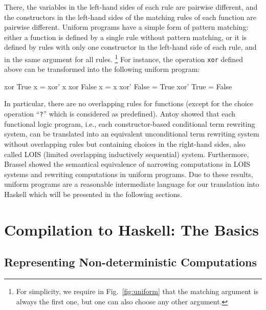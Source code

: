 \documentclass{llncs}
\newcommand{\code}[1]{\mbox{\small\texttt{#1}}}
\newcommand{\ccode}[1]{``\code{#1}''}
\begin{document}
There, the variables in the left-hand sides of each rule are pairwise
different, and
the constructors in the left-hand sides of the matching rules of each function
are pairwise different.
Uniform programs have a simple form of pattern matching:
either a function is defined by a single rule without pattern matching,
or it is defined by rules with only one constructor in the left-hand
side of each rule, and in the same argument for all rules.%
\footnote{For simplicity, we require in
Fig.~\ref{fig:uniform} that the matching argument is always the
first one, but one can also choose any other argument.}
For instance, the operation \code{xor} defined above can be transformed
into the following uniform program:
%
\begin{curry}
  xor True   x = xor' x
  xor False  x = x
  xor' False = True
  xor' True  = False
\end{curry}
%
In particular, there are no overlapping rules for functions
(except for the choice operation \ccode{?} which is considered as predefined).
Antoy \cite{Antoy01PPDP} showed that each functional logic program,
i.e., each constructor-based conditional term rewriting system,
can be translated into an equivalent unconditional term rewriting system
without overlapping rules but containing choices in the right-hand sides,
also called LOIS (limited overlapping inductively sequential) system.
Furthermore, Brassel \cite{Brassel11Thesis} showed the semantical
equivalence of narrowing computations in LOIS systems
and rewriting computations in uniform programs.
Due to these results, uniform programs are a reasonable intermediate
language for our translation into Haskell which will be presented
in the following sections.


\section{Compilation to Haskell: The Basics}
\label{sec:Compilation}

\subsection{Representing Non-deterministic Computations}
\end{document}
